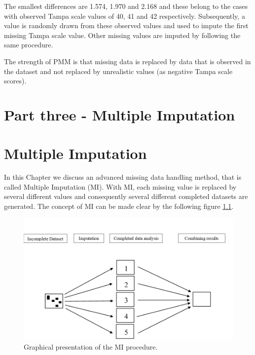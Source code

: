 \documentclass[]{book}
\begin{document}
The smallest differences are 1.574, 1.970 and 2.168 and these belong to
the cases with observed Tampa scale values of 40, 41 and 42
respectively. Subsequently, a value is randomly drawn from these
observed values and used to impute the first missing Tampa scale value.
Other missing values are imputed by following the same procedure.

The strength of PMM is that missing data is replaced by data that is
observed in the dataset and not replaced by unrealistic values (as
negative Tampa scale scores).

\chapter*{Part three - Multiple
Imputation}\label{part-three---multiple-imputation}

\chapter{Multiple Imputation}\label{multiple-imputation}

In this Chapter we discuss an advanced missing data handling method,
that is called Multiple Imputation (MI). With MI, each missing value is
replaced by several different values and consequently several different
completed datasets are generated. The concept of MI can be made clear by
the following figure \ref{fig:fig4-1}.

\begin{figure}

{\centering \includegraphics[width=0.9\linewidth]{images/fig4.1} 

}

\caption{Graphical presentation of the MI procedure.}\label{fig:fig4-1}
\end{figure}
\end{document}
